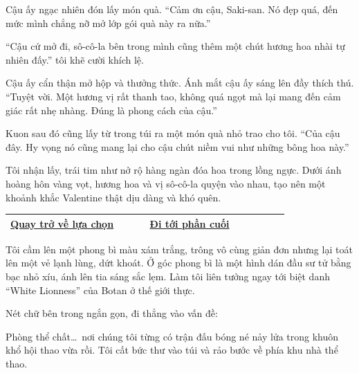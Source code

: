 \documentclass[../main.tex]{subfiles}
\begin{document}
Cậu ấy ngạc nhiên đón lấy món quà. ``Cảm ơn cậu, Saki-san. Nó đẹp quá, đến mức mình chẳng nỡ mở lớp gói quà này ra nữa.''

``Cậu cứ mở đi, sô-cô-la bên trong mình cũng thêm một chút hương hoa nhài tự nhiên đấy.'' tôi khẽ cười khích lệ.

Cậu ấy cẩn thận mở hộp và thưởng thức. Ánh mắt cậu ấy sáng lên đầy thích thú. ``Tuyệt vời. Một hương vị rất thanh tao, không quá ngọt mà lại mang đến cảm giác rất nhẹ nhàng. Đúng là phong cách của cậu.''

Kuon sau đó cũng lấy từ trong túi ra một món quà nhỏ trao cho tôi. ``Của cậu đây. Hy vọng nó cũng mang lại cho cậu chút niềm vui như những bông hoa này.''

Tôi nhận lấy, trái tim như nở rộ hàng ngàn đóa hoa trong lồng ngực. Dưới ánh hoàng hôn vàng vọt, hương hoa và vị sô-cô-la quyện vào nhau, tạo nên một khoảnh khắc Valentine thật dịu dàng và khó quên.

\begin{table}[H]
  \centering
  \setlength{\arrayrulewidth}{1pt}
  \begin{tabular}{|>{\centering\arraybackslash}p{0.4\linewidth}|>{\centering\arraybackslash}p{0.4\linewidth}|}
    \hline
    \hyperref[choice]{Quay trở về lựa chọn} & \hyperref[ending]{Đi tới phần cuối} \\ \hline
  \end{tabular}
\end{table}

\newpage
\label{shiina}

Tôi cầm lên một phong bì màu xám trắng, trông vô cùng giản đơn nhưng lại toát lên một vẻ lạnh lùng, dứt khoát. Ở góc phong bì là một hình dán đầu sư tử bằng bạc nhỏ xíu, ánh lên tia sáng sắc lẹm. Làm tôi liên tưởng ngay tới biệt danh ``White Lionness'' của Botan ở thế giới thực.

Nét chữ bên trong ngắn gọn, đi thẳng vào vấn đề:


Phòng thể chất\dots\ nơi chúng tôi từng có trận đấu bóng né nảy lửa trong khuôn khổ hội thao vừa rồi. Tôi cất bức thư vào túi và rảo bước về phía khu nhà thể thao.

\ct

\end{document}
